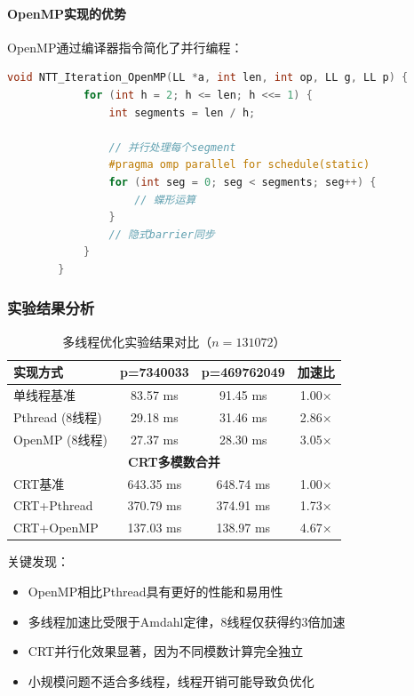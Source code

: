 \documentclass[a4paper]{article}
\begin{document}
	\paragraph{OpenMP实现的优势}
	
	OpenMP通过编译器指令简化了并行编程：
	
	\begin{lstlisting}[language=C++, caption=OpenMP并行化NTT]
		void NTT_Iteration_OpenMP(LL *a, int len, int op, LL g, LL p) {
			for (int h = 2; h <= len; h <<= 1) {
				int segments = len / h;
				
				// 并行处理每个segment
				#pragma omp parallel for schedule(static)
				for (int seg = 0; seg < segments; seg++) {
					// 蝶形运算
				}
				// 隐式barrier同步
			}
		}
	\end{lstlisting}
	
	\subsubsection{实验结果分析}
	
	\begin{table}[H]
		\centering
		\caption{多线程优化实验结果对比（$n=131072$）}
		\begin{tabular}{|l|c|c|c|}
			\hline
			\textbf{实现方式} & \textbf{p=7340033} & \textbf{p=469762049} & \textbf{加速比} \\
			\hline
			单线程基准 & 83.57 ms & 91.45 ms & 1.00× \\
			\hline
			Pthread (8线程) & 29.18 ms & 31.46 ms & 2.86× \\
			\hline
			OpenMP (8线程) & 27.37 ms & 28.30 ms & 3.05× \\
			\hline
			\multicolumn{4}{|c|}{\textbf{CRT多模数合并}} \\
			\hline
			CRT基准 & 643.35 ms & 648.74 ms & 1.00× \\
			\hline
			CRT+Pthread & 370.79 ms & 374.91 ms & 1.73× \\
			\hline
			CRT+OpenMP & 137.03 ms & 138.97 ms & 4.67× \\
			\hline
		\end{tabular}
	\end{table}
	
	关键发现：
	\begin{itemize}
		\item OpenMP相比Pthread具有更好的性能和易用性
		\item 多线程加速比受限于Amdahl定律，8线程仅获得约3倍加速
		\item CRT并行化效果显著，因为不同模数计算完全独立
		\item 小规模问题不适合多线程，线程开销可能导致负优化
	\end{itemize}
	
\end{document}
